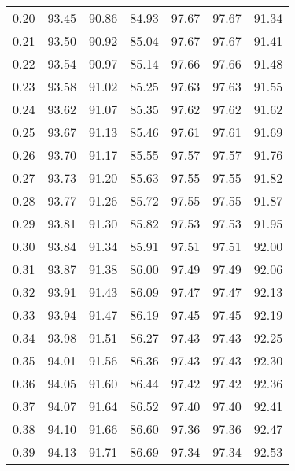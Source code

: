 \begin{tabular}{|c|c|c|c|c|c|c|}
      0.20 &     93.45 &     90.86 &      84.93 &   97.67 &      97.67 &         91.34 \\
      0.21 &     93.50 &     90.92 &      85.04 &   97.67 &      97.67 &         91.41 \\
      0.22 &     93.54 &     90.97 &      85.14 &   97.66 &      97.66 &         91.48 \\
      0.23 &     93.58 &     91.02 &      85.25 &   97.63 &      97.63 &         91.55 \\
      0.24 &     93.62 &     91.07 &      85.35 &   97.62 &      97.62 &         91.62 \\
      0.25 &     93.67 &     91.13 &      85.46 &   97.61 &      97.61 &         91.69 \\
      0.26 &     93.70 &     91.17 &      85.55 &   97.57 &      97.57 &         91.76 \\
      0.27 &     93.73 &     91.20 &      85.63 &   97.55 &      97.55 &         91.82 \\
      0.28 &     93.77 &     91.26 &      85.72 &   97.55 &      97.55 &         91.87 \\
      0.29 &     93.81 &     91.30 &      85.82 &   97.53 &      97.53 &         91.95 \\
      0.30 &     93.84 &     91.34 &      85.91 &   97.51 &      97.51 &         92.00 \\
      0.31 &     93.87 &     91.38 &      86.00 &   97.49 &      97.49 &         92.06 \\
      0.32 &     93.91 &     91.43 &      86.09 &   97.47 &      97.47 &         92.13 \\
      0.33 &     93.94 &     91.47 &      86.19 &   97.45 &      97.45 &         92.19 \\
      0.34 &     93.98 &     91.51 &      86.27 &   97.43 &      97.43 &         92.25 \\
      0.35 &     94.01 &     91.56 &      86.36 &   97.43 &      97.43 &         92.30 \\
      0.36 &     94.05 &     91.60 &      86.44 &   97.42 &      97.42 &         92.36 \\
      0.37 &     94.07 &     91.64 &      86.52 &   97.40 &      97.40 &         92.41 \\
      0.38 &     94.10 &     91.66 &      86.60 &   97.36 &      97.36 &         92.47 \\
      0.39 &     94.13 &     91.71 &      86.69 &   97.34 &      97.34 &         92.53 \\

\end{tabular}
